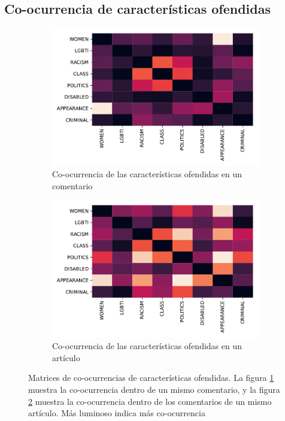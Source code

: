 \subsection{Co-ocurrencia de características ofendidas}

\begin{figure}[t]
    \centering
    \begin{subfigure}[]{0.49\textwidth}
        \includegraphics[width=\textwidth]{img/05/heatmap_characteristics.pdf}
        \caption{Co-ocurrencia de las características ofendidas en un comentario}
        \label{subfig:heatmap_characteristics_comment}
    \end{subfigure}
    \begin{subfigure}[]{0.49\textwidth}
        \centering
        \includegraphics[width=\textwidth]{img/05/heatmap_characteristics_article.pdf}
        \caption{Co-ocurrencia de las características ofendidas en un artículo}
        \label{subfig:heatmap_characteristics_article}
    \end{subfigure}

    \caption{Matrices de co-ocurrencias de características ofendidas. La figura \ref{subfig:heatmap_characteristics_comment} muestra la co-ocurrencia dentro de un mismo comentario, y la figura \ref{subfig:heatmap_characteristics_article} muestra la co-ocurrencia dentro de los comentarios de un mismo artículo. Más luminoso indica más co-ocurrencia}
    \label{fig:heatmap_characteristics}
\end{figure}


